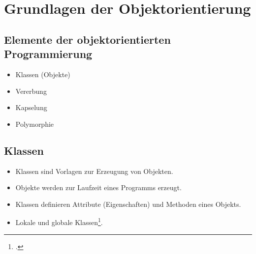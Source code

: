 \section{Grundlagen der Objektorientierung}

\subsection{Elemente der objektorientierten Programmierung}
\begin{itemize}
    \item Klassen (Objekte)
    \item Vererbung
    \item Kapselung
    \item Polymorphie
\end{itemize}

\subsection{Klassen}
\begin{itemize}
    \item Klassen sind Vorlagen zur Erzeugung von Objekten.
    \item Objekte werden zur Laufzeit eines Programms erzeugt.
    \item Klassen definieren Attribute (Eigenschaften) und Methoden eines Objekts.
    \item Lokale und globale Klassen\footcite[Vgl.][S. 4]{zaidiSAPABAPObjects2019}. 
\end{itemize}
